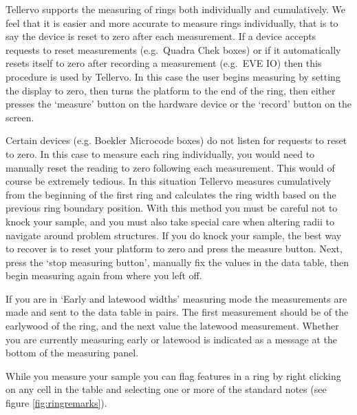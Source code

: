 Tellervo supports the measuring of rings both individually and cumulatively.  We feel that it is easier and more accurate to measure rings individually, that is to say the device is reset to zero after each measurement.  If a device accepts requests to reset measurements (e.g.\ Quadra Chek boxes) or if it automatically resets itself to zero after recording a measurement (e.g.\ EVE IO) then this procedure is used by Tellervo.  In this case the user begins measuring by setting the display to zero, then turns the platform to the end of the ring, then either presses the `measure' button on the hardware device or the `record' button on the screen.


Certain devices (e.g. Boekler Microcode boxes) do not listen for requests to reset to zero.  In this case to measure each ring individually, you would need to manually reset the reading to zero following each measurement.  This would of course be extremely tedious.  In this situation Tellervo measures cumulatively from the beginning of the first ring and calculates the ring width based on the previous ring boundary position.  With this method you must be careful not to knock your sample, and you must also take special care when altering radii to navigate around problem structures.  If you do knock your sample, the best way to recover is to reset your platform to zero and press the measure button.  Next, press the `stop measuring button', manually fix the values in the data table, then begin measuring again from where you left off.

If you are in `Early and latewood widths' measuring mode the measurements are made and sent to the data table in pairs.  The first measurement should be of the earlywood of the ring, and the next value the latewood measurement.  Whether you are currently measuring early or latewood is indicated as a message at the bottom of the measuring panel.

While you measure your sample you can flag features in a ring by right clicking on any cell in the table and selecting one or more of the standard notes (see figure \ref{fig:ringremarks}).

